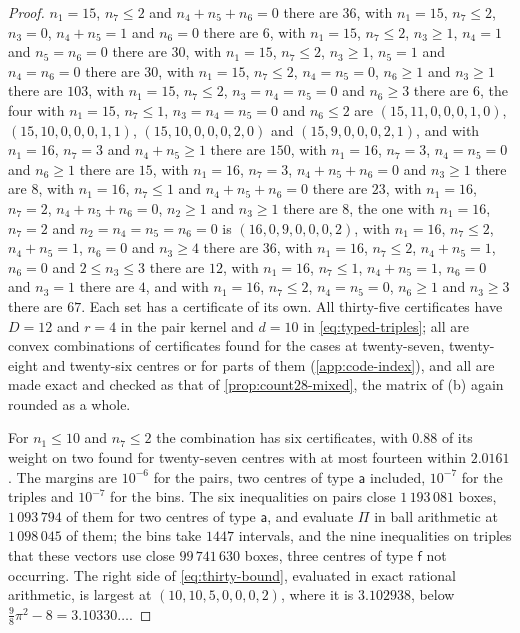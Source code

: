 \documentclass[11pt,reqno]{amsart}
\renewcommand{\_}{\origunderscore\allowbreak}
\numberwithin{equation}{section}
\theoremstyle{plain}
\theoremstyle{definition}
\theoremstyle{remark}
\begin{document}
\begin{proof}
$n_1=15$, $n_7\le2$ and $n_4+n_5+n_6=0$ there are $36$, with
$n_1=15$, $n_7\le2$, $n_3=0$, $n_4+n_5=1$ and $n_6=0$ there are $6$, with
$n_1=15$, $n_7\le2$, $n_3\ge1$, $n_4=1$ and $n_5=n_6=0$ there are $30$,
with $n_1=15$, $n_7\le2$, $n_3\ge1$, $n_5=1$ and $n_4=n_6=0$ there are
$30$, with $n_1=15$, $n_7\le2$, $n_4=n_5=0$, $n_6\ge1$ and $n_3\ge1$
there are $103$, with $n_1=15$, $n_7\le2$, $n_3=n_4=n_5=0$ and $n_6\ge3$ there are $6$, the four with $n_1=15$, $n_7\le1$, $n_3=n_4=n_5=0$ and $n_6\le2$ are $(15,11,0,0,0,1,0)$, $(15,10,0,0,0,1,1)$, $(15,10,0,0,0,2,0)$ and $(15,9,0,0,0,2,1)$, and with
$n_1=16$, $n_7=3$ and $n_4+n_5\ge1$ there are $150$, with $n_1=16$,
$n_7=3$, $n_4=n_5=0$ and $n_6\ge1$ there are $15$, with $n_1=16$,
$n_7=3$, $n_4+n_5+n_6=0$ and $n_3\ge1$ there are $8$, with $n_1=16$,
$n_7\le1$ and $n_4+n_5+n_6=0$ there are $23$, with $n_1=16$, $n_7=2$,
$n_4+n_5+n_6=0$, $n_2\ge1$ and $n_3\ge1$ there are $8$, the one with
$n_1=16$, $n_7=2$ and $n_2=n_4=n_5=n_6=0$ is $(16,0,9,0,0,0,2)$, with
$n_1=16$, $n_7\le2$, $n_4+n_5=1$, $n_6=0$ and $n_3\ge4$ there are $36$,
with $n_1=16$, $n_7\le2$, $n_4+n_5=1$, $n_6=0$ and $2\le n_3\le3$ there
are $12$, with $n_1=16$, $n_7\le1$, $n_4+n_5=1$, $n_6=0$ and $n_3=1$ there
are $4$, and with $n_1=16$, $n_7\le2$, $n_4=n_5=0$, $n_6\ge1$ and $n_3\ge3$ there
are $67$. Each set has a certificate of its own. All thirty-five
certificates have $D=12$ and $r=4$ in the pair kernel and
$d=10$ in \eqref{eq:typed-triples}; all are convex combinations of
certificates found for the cases at twenty-seven, twenty-eight and
twenty-six centres or for parts of them (\cref{app:code-index}), and all are
made exact and checked as that of \cref{prop:count28-mixed}, the matrix of
(b) again rounded as a whole.

For $n_1\le10$ and $n_7\le2$ the combination has six certificates, with $0.88$ of its
weight on two found for twenty-seven centres with at most fourteen within
$2.0161$. The margins are $10^{-6}$ for the pairs, two centres of type
$\mathsf a$ included, $10^{-7}$ for the triples and $10^{-7}$ for the bins.
The six inequalities on pairs close $1\,193\,081$ boxes, $1\,093\,794$ of
them for two centres of type $\mathsf a$, and evaluate $\Pi$ in ball
arithmetic at $1\,098\,045$ of them; the bins take $1447$ intervals, and the
nine inequalities on triples that these vectors use close $99\,741\,630$
boxes, three centres of type $\mathsf f$ not occurring. The right side of
\eqref{eq:thirty-bound}, evaluated in exact rational arithmetic, is largest
at $(10,10,5,0,0,0,2)$, where it is $3.102938$, below
$\frac98\pi^2-8=3.10330\ldots$.


\end{proof}
\end{document}
